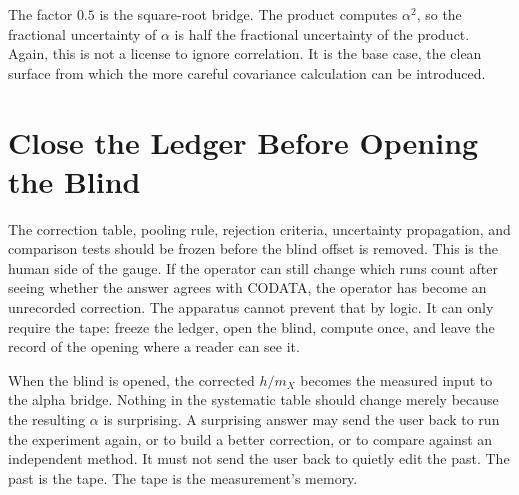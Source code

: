 The factor \(0.5\) is the square-root bridge. The product computes \(\alpha^2\), so the fractional uncertainty
of \(\alpha\) is half the fractional uncertainty of the product. Again, this is not a license to ignore
correlation. It is the base case, the clean surface from which the more careful covariance calculation can be
introduced.

\section{Close the Ledger Before Opening the Blind}

The correction table, pooling rule, rejection criteria, uncertainty propagation, and comparison tests should be
frozen before the blind offset is removed. This is the human side of the gauge. If the operator can still change
which runs count after seeing whether the answer agrees with CODATA, the operator has become an unrecorded
correction. The apparatus cannot prevent that by logic. It can only require the tape: freeze the ledger, open the
blind, compute once, and leave the record of the opening where a reader can see it.

When the blind is opened, the corrected \(h/m_X\) becomes the measured input to the alpha bridge. Nothing in the
systematic table should change merely because the resulting \(\alpha\) is surprising. A surprising answer may
send the user back to run the experiment again, or to build a better correction, or to compare against an
independent method. It must not send the user back to quietly edit the past. The past is the tape. The tape is
the measurement's memory.
